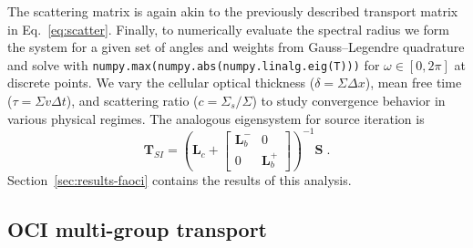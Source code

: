 The scattering matrix is again akin to the previously described transport matrix in Eq.~\eqref{eq:scatter}.
Finally, to numerically evaluate the spectral radius we form the system for a given set of angles and weights from Gauss--Legendre quadrature and solve with \texttt{numpy.max(numpy.abs(numpy.linalg.eig(T)))} for $\omega \in [0,2\pi]$ at discrete points.
We vary the cellular optical thickness ($\delta =\Sigma \Delta x$), mean free time ($\tau = \Sigma v\Delta t$), and scattering ratio ($c=\Sigma_s/\Sigma$) to study convergence behavior in various physical regimes. 
The analogous eigensystem for source iteration is
\begin{equation}
    \bm{T}_{SI} = \left( 
    \bm{L}_c
    + \begin{bmatrix}
        \bm{L}_b^- & 0\\
        0 & \bm{L}_b^+
    \end{bmatrix}
    \right)^{-1}
    \bm{S} \; .
\end{equation} 
Section~\ref{sec:results-faoci} contains the results of this analysis.


\subsection{OCI multi-group transport}

